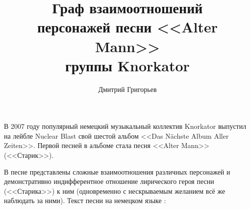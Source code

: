 \documentclass[a4paper,12pt,notitlepage]{article}
\author{Дмитрий Григорьев}
\title{Граф взаимоотношений\\персонажей песни <<Alter Mann>>\\группы Knorkator}
\begin{document}
  \maketitle

  В 2007 году популярный немецкий музыкальный коллектив Knorkator выпустил на лейбле Nuclear Blast свой шестой альбом <<Das Nächste Album Aller Zeiten>>. Первой песней в альбоме стала песня <<Alter Mann>> (<<Старик>>).

  В песне представлены сложные взаимоотношения различных персонажей и демонстративно индифферентное отношение лирического героя песни (<<Старика>>) к ним (одновременно с нескрываемым желанием всё же наблюдать за ними). Текст песни на немецком языке \cite{knorkator01}:
  
  
  \settowidth{\versewidth}{Doch Pech denn er ist schon länger}
  
\end{document}
